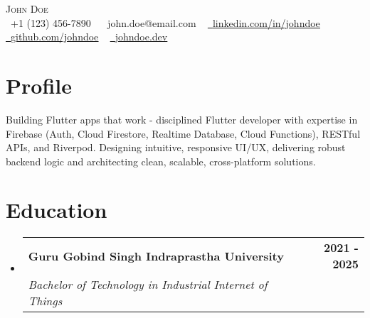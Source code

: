 \documentclass[a4paper,10pt]{article}
\makeatletter
\newcommand{\resumeSubheading}[4]{
  \vspace{-2pt}\item
    \begin{tabular*}{1.0\textwidth}[t]{l@{\extracolsep{\fill}}r}
      \textbf{#1} & \textbf{\small #2} \\
      \textit{\small#3} & \textit{\small #4} \\
    \end{tabular*}\vspace{-7pt}
}
\newcommand{\resumeSubHeadingListStart}{\begin{itemize}[leftmargin=0.0in, label={}]}
\newcommand{\resumeSubHeadingListEnd}{\end{itemize}}
\makeatother
\begin{document}
\begin{center}
    {\Huge \scshape John Doe} \\ \vspace{5pt}
    \small \raisebox{-0.1\height}\faPhone\ +1 (123) 456-7890 ~
    \small \raisebox{-0.1\height}\faEnvelope\ john.doe@email.com ~
    \href{https://linkedin.com/in/johndoe}{\raisebox{-0.2\height}\faLinkedin\ \underline{linkedin.com/in/johndoe}} ~
    \href{https://github.com/johndoe}{\raisebox{-0.2\height}\faGithub\ \underline{github.com/johndoe}} ~
    \href{https://johndoe.dev}{\raisebox{-0.2\height}\faGlobe\ \underline{johndoe.dev}}
    \vspace{-6pt}
\end{center}

\section{Profile}
\small{Building Flutter apps that work - disciplined Flutter developer with expertise in Firebase (Auth, Cloud Firestore, Realtime Database, Cloud Functions), RESTful APIs, and Riverpod. Designing intuitive, responsive UI/UX, delivering robust backend logic and architecting clean, scalable, cross-platform solutions.}
\vspace{-6pt}

\section{Education}
  \resumeSubHeadingListStart
    \resumeSubheading
      {Guru Gobind Singh Indraprastha University}{2021 - 2025}
      {Bachelor of Technology in Industrial Internet of Things}{}
  \resumeSubHeadingListEnd
\vspace{-6pt}

\end{document}
